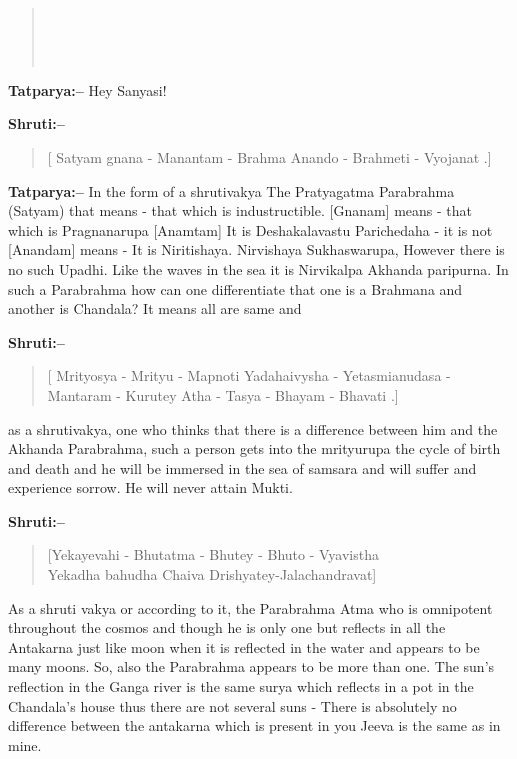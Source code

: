 \begin{verse}
 \\\\\\
\end{verse}

\textbf{Tatparya:–} Hey Sanyasi!

\textbf{Shruti:–}

\begin{verse}
[ Satyam gnana - Manantam - Brahma  Anando - Brahmeti - Vyojanat .]
\end{verse}

\textbf{Tatparya:–} In the form of a shrutivakya The Pratyagatma Parabrahma (Satyam) that means - that which is industructible. [Gnanam] means - that which is Pragnanarupa [Anamtam] It is Deshakalavastu Parichedaha - it is not [Anandam] means - It is Niritishaya. Nirvishaya Sukhaswarupa, However there is no such Upadhi. Like the waves in the sea it is Nirvikalpa Akhanda paripurna. In such a Parabrahma how can one differentiate that one is a Brahmana and another is Chandala? It means all are same and

\newpage

\textbf{Shruti:–}

\begin{verse}
[ Mrityosya - Mrityu - Mapnoti  Yadahaivysha - Yetasmianudasa - Mantaram - Kurutey  Atha - Tasya - Bhayam - Bhavati .]
\end{verse}

as a shrutivakya, one who thinks that there is a difference between him and the Akhanda Parabrahma, such a person gets into the mrityurupa the cycle of birth and death and he will be immersed in the sea of samsara and will suffer and experience sorrow. He will never attain Mukti.

\textbf{Shruti:–}

\begin{verse}
[Yekayevahi - Bhutatma - Bhutey - Bhuto - Vyavistha\\ Yekadha bahudha Chaiva Drishyatey-Jalachandravat]
\end{verse}

As a shruti vakya or according to it, the Parabrahma Atma who is omnipotent throughout the cosmos and though he is only one but reflects in all the Antakarna just like moon when it is reflected in the water and appears to be many moons. So, also the Parabrahma appears to be more than one. The sun's reflection in the Ganga river is the same surya which reflects in a pot in the Chandala's house thus there are not several suns - There is absolutely no difference between the antakarna which is present in you Jeeva is the same as in mine.

